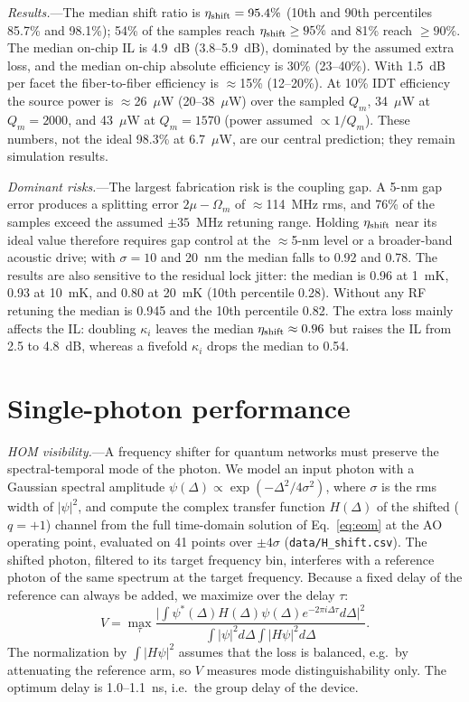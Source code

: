 \documentclass[aps,prapplied,reprint,superscriptaddress,amsmath,amssymb,floatfix]{revtex4-2}
\newcommand{\etash}{\eta_{\rm shift}}
\begin{document}
\emph{Results.}---The median shift ratio is $\etash=95.4\%$ (10th and 90th percentiles 85.7\% and 98.1\%); 54\% of the samples reach $\etash\ge95\%$ and 81\% reach $\ge90\%$. The median on-chip IL is 4.9~dB (3.8--5.9~dB), dominated by the assumed extra loss, and the median on-chip absolute efficiency is 30\% (23--40\%). With 1.5~dB per facet the fiber-to-fiber efficiency is $\approx$15\% (12--20\%). At 10\% IDT efficiency the source power is $\approx$26~$\mu$W (20--38~$\mu$W) over the sampled $Q_m$, 34~$\mu$W at $Q_m=2000$, and 43~$\mu$W at $Q_m=1570$ (power assumed $\propto1/Q_m$). These numbers, not the ideal 98.3\% at 6.7~$\mu$W, are our central prediction; they remain simulation results.

\emph{Dominant risks.}---The largest fabrication risk is the coupling gap. A 5-nm gap error produces a splitting error $2\mu-\Omega_m$ of $\approx$114~MHz rms, and 76\% of the samples exceed the assumed $\pm35$~MHz retuning range. Holding $\etash$ near its ideal value therefore requires gap control at the $\approx$5-nm level or a broader-band acoustic drive; with $\sigma=10$ and 20~nm the median falls to 0.92 and 0.78. The results are also sensitive to the residual lock jitter: the median is 0.96 at 1~mK, 0.93 at 10~mK, and 0.80 at 20~mK (10th percentile 0.28). Without any RF retuning the median is 0.945 and the 10th percentile 0.82. The extra loss mainly affects the IL: doubling $\kappa_i$ leaves the median $\etash\approx0.96$ but raises the IL from 2.5 to 4.8~dB, whereas a fivefold $\kappa_i$ drops the median to 0.54.

\section{Single-photon performance}\label{sec:quantum}
\emph{HOM visibility.}---A frequency shifter for quantum networks must preserve the spectral-temporal mode of the photon. We model an input photon with a Gaussian spectral amplitude $\psi(\Delta)\propto\exp(-\Delta^2/4\sigma^2)$, where $\sigma$ is the rms width of $|\psi|^2$, and compute the complex transfer function $H(\Delta)$ of the shifted ($q=+1$) channel from the full time-domain solution of Eq.~\eqref{eq:eom} at the AO operating point, evaluated on 41 points over $\pm4\sigma$ (\texttt{data/H\_shift.csv}). The shifted photon, filtered to its target frequency bin, interferes with a reference photon of the same spectrum at the target frequency. Because a fixed delay of the reference can always be added, we maximize over the delay $\tau$:
\begin{equation}
V=\max_\tau\frac{\big|\int\psi^*(\Delta)H(\Delta)\psi(\Delta)e^{-2\pi i\Delta\tau}d\Delta\big|^2}{\int|\psi|^2d\Delta\int|H\psi|^2d\Delta}.
\label{eq:hom}
\end{equation}
The normalization by $\int|H\psi|^2$ assumes that the loss is balanced, e.g.\ by attenuating the reference arm, so $V$ measures mode distinguishability only. The optimum delay is 1.0--1.1~ns, i.e.\ the group delay of the device.
\end{document}

